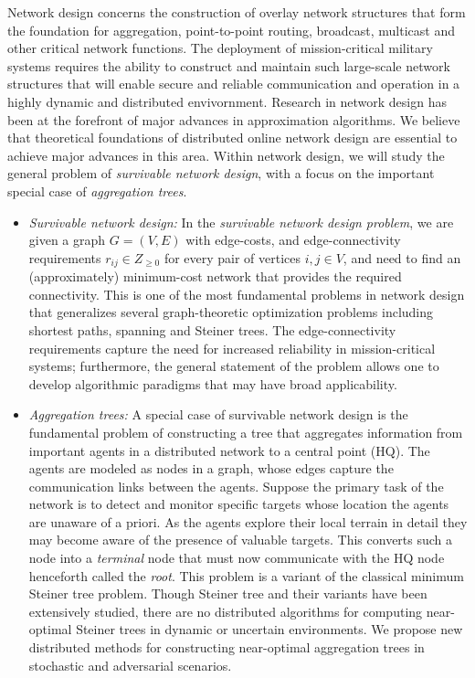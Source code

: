  Network design concerns the construction of
overlay network structures that form the foundation for aggregation,
point-to-point routing, broadcast, multicast and other critical
network functions.  The deployment of mission-critical military
systems requires the ability to construct and maintain such
large-scale network structures that will enable secure and reliable
communication and operation in a highly dynamic and distributed
envivornment.  Research in network design has been at the forefront of
major advances in approximation algorithms.  We believe that
theoretical foundations of distributed online network design are
essential to achieve major advances in this area.  Within network
design, we will study the general problem of {\em survivable network
  design}, with a focus on the important special case of {\em
  aggregation trees}.

\begin{itemize}
\item
{\sl Survivable network design:} In the {\em survivable network design
  problem}, we are given a graph $G = (V,E)$ with edge-costs, and
edge-connectivity requirements $r_{ij} \in Z_{\ge 0}$ for every pair
of vertices $i, j \in V$, and need to find an (approximately)
minimum-cost network that provides the required connectivity.  This is
one of the most fundamental problems in network design that
generalizes several graph-theoretic optimization problems including
shortest paths, spanning and Steiner trees.  The edge-connectivity
requirements capture the need for increased reliability in
mission-critical systems; furthermore, the general statement of the
problem allows one to develop algorithmic paradigms that may have
broad applicability.

\item
{\sl Aggregation trees:} A special case of survivable network design
is the fundamental problem of constructing a tree that aggregates
information from important agents in a distributed network to a
central point (HQ). The agents are modeled as nodes in a graph, whose
edges capture the communication links between the agents.  Suppose the
primary task of the network is to detect and monitor specific targets
whose location the agents are unaware of a priori.  As the agents
explore their local terrain in detail they may become aware of the
presence of valuable targets. This converts such a node into a {\em
  terminal} node that must now communicate with the HQ node henceforth
called the {\em root}.  This problem is a variant of the classical
minimum Steiner tree problem.  Though Steiner tree and their variants
have been extensively studied, there are no distributed algorithms for
computing near-optimal Steiner trees in dynamic or uncertain
environments.  We propose new distributed methods for constructing
near-optimal aggregation trees in stochastic and adversarial
scenarios.
\end{itemize}

